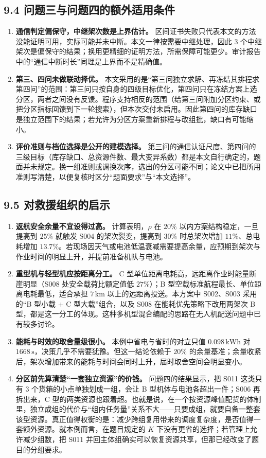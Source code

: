 \documentclass[withoutpreface,bwprint]{format}
\begin{document}
\subsection{9.4 问题三与问题四的额外适用条件}
\begin{enumerate}[leftmargin=*]
    \item \textbf{通信判定偏保守，中继架次数是上界估计。} 区间证书失败只代表本文的方法没能证明可用，实际可能并未中断。本文一律按需要中继处理，因此 3 个中继架次是偏保守的结果；换用更精细的证明方法，所需保障可能更少。审计报告中的“通信中断时长”同理是上界而不是精确值。
    \item \textbf{第三、四问未做联动择优。} 本文采用的是“第三问独立求解、再冻结其排程求第四问”的范围：第三问只按自身的四级目标优化，第四问只在冻结方案上选分区，两者之间没有反馈。程序支持相反的范围（给第三问附加分区约束、或把分区指标回馈到下一轮搜索），但本次交付未启用。因此第四问的库存缺口是独立范围下的结果；若允许为分区方案重新排程与改组批，缺口有可能缩小。
    \item \textbf{评价准则与档位选择是公开的建模选择。} 第三问的通信认证尺度、第四问的三级目标（库存缺口、总资源件数、最大变异系数）都是本文自行确定的，题面并未规定。换一组准则或调换次序，选出的分区可能不同；论文中已把所用准则写清楚，以便复核时区分“题面要求”与“本文选择”。
\end{enumerate}

\subsection{9.5 对救援组织的启示}
\begin{enumerate}[leftmargin=*]
    \item \textbf{返航安全余量不宜设得过高。} 计算表明，$\rho$ 在 $20\%$ 以内方案结构稳定，一旦提高到 $25\%$ 就触发 S004 的架次裂变，提高到 $30\%$ 时总架次增加 $11\%$、总电耗增加 $13.7\%$。若现场因天气或电池低温衰减需要提高余量，应预期到架次与作业时间的明显上升，并提前准备机队与电池。
    \item \textbf{重型机与轻型机应按距离分工。} C 型单位距离电耗高，远距离作业时能量断崖明显（S008 处安全载荷比额定值低 $27\%$）；B 型空载标准航程最长、单位距离电耗最低，适合承担 $7\,\text{km}$ 以上的远距离投送。本方案中 S002、S003 采用的“B 型小载 $+$ C 型大载”组合，以及 S008 在能耗优先策略下改用两架次 B 型，都是这一分工的体现。这种多机型混合编配的思路在无人机配送问题中已有较多讨论\cite{moshref2020}。
    \item \textbf{能耗与时效的取舍量级很小。} 本例中省电与省时的对立只值 $0.098\,\text{kWh}$ 对 $1668\,\text{s}$，决策几乎不需要犹豫。但这一结论依赖于 $20\%$ 的余量基准；余量收紧后，架次增加带来的能耗与时间会同时上升，届时取舍空间会明显变小。
    \item \textbf{分区前先算清楚“一套独立资源”的价钱。} 问题四的结果显示，把 S011 这类只有 3 个货箱的小点单独划成一组，会让 B 型机体与电池各超出一件；S006 再拆出来，C 型的两类资源也跟着超。也就是说，在一个按资源峰值配货的体制里，独立成组的代价与“组内任务量”关系不大——只要成组，就要自备一整套该型资源。真正值得权衡的是：减少跨组复用带来的调度复杂度，是否值得一套额外资源。就本例而言，在题目规定的 $K$ 下没有更省的选择；若管理上允许减少组数，把 S011 并回主体组确实可以恢复资源共享，但那已经改变了题目的分组要求。
\end{enumerate}
\end{document}
